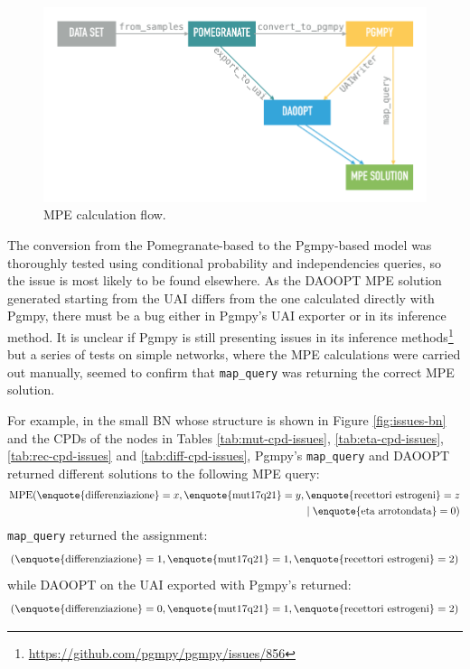 \begin{figure}[htbp]
\centerline{\includegraphics[width=\textwidth]{results/images/mpe_conversion_process}}
\caption{MPE calculation flow.}
\label{fig:mpe_conversion_process}
\end{figure}

The conversion from the Pomegranate-based to the Pgmpy-based model was thoroughly tested using conditional probability and independencies queries, so the issue is most likely to be found elsewhere.
As the DAOOPT MPE solution generated starting from the UAI differs from the one calculated directly with Pgmpy, there must be a bug either in Pgmpy's UAI exporter or in its inference method.
It is unclear if Pgmpy is still presenting issues in its inference methods\footnote{\url{https://github.com/pgmpy/pgmpy/issues/856}} but a series of tests on simple networks, where the MPE calculations were carried out manually, seemed to confirm that \texttt{map\_query} was returning the correct MPE solution.

For example, in the small BN whose structure is shown in Figure \ref{fig:issues-bn} and the CPDs of the nodes in Tables \ref{tab:mut-cpd-issues}, \ref{tab:eta-cpd-issues}, \ref{tab:rec-cpd-issues} and \ref{tab:diff-cpd-issues}, Pgmpy's \texttt{map\_query} and DAOOPT returned different solutions to the following MPE query:
\begin{align}
\begin{split}
	\text{MPE}( \text{\enquote{differenziazione}}=x, \text{\enquote{mut17q21}}=y, \text{\enquote{recettori estrogeni}}=z \\
	\mid \text{\enquote{eta arrotondata}}=0 )
\end{split} 
\end{align}
\texttt{map\_query} returned the assignment: 
\begin{align} \label{eq:pgmpy-assignment}
  (\text{\enquote{differenziazione}}=1, 
  \text{\enquote{mut17q21}}=1, 
  \text{\enquote{recettori estrogeni}}=2)
\end{align}
while DAOOPT on the UAI exported with Pgmpy's returned:
\begin{align} \label{eq:daoopt-assignment}
  (\text{\enquote{differenziazione}}=0, 
  \text{\enquote{mut17q21}}=1, 
  \text{\enquote{recettori estrogeni}}=2)
\end{align}

